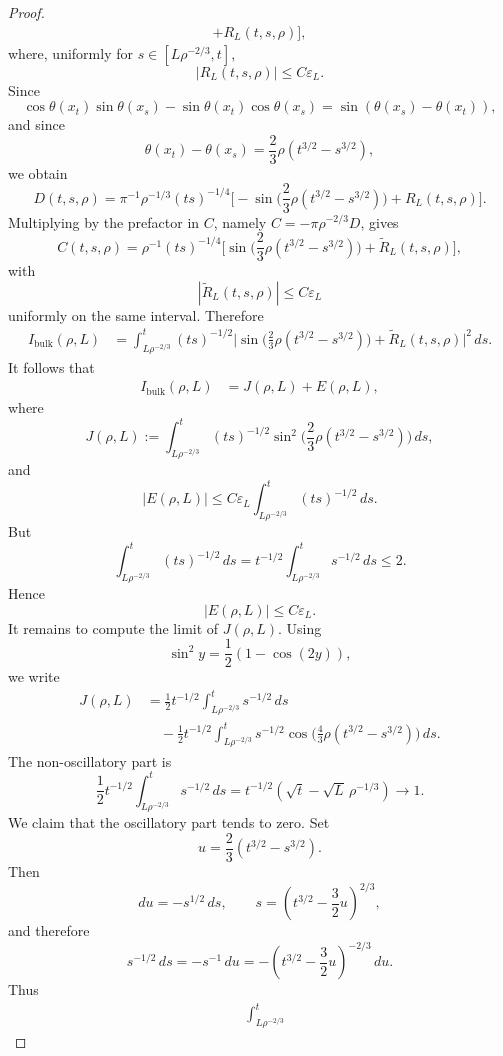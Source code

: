 \documentclass{article}
\begin{document}
\begin{proof}
\[\begin{aligned}
 +
 R_L(t,s,\rho)
\Big],
\end{aligned}
\]
where, uniformly for \(s\in[L\rho^{-2/3},t]\),
\[
  |R_L(t,s,\rho)|\le C\varepsilon_L .
\]
Since
\[
  \cos\theta(x_t)\sin\theta(x_s)
  -
  \sin\theta(x_t)\cos\theta(x_s)
  =
  \sin(\theta(x_s)-\theta(x_t)),
\]
and since
\[
  \theta(x_t)-\theta(x_s)
  =
  \frac23 \rho(t^{3/2}-s^{3/2}),
\]
we obtain
\[
D(t,s,\rho)
=
\pi^{-1}\rho^{-1/3}(ts)^{-1/4}
\Big[
 -\sin\Big(\frac23\rho(t^{3/2}-s^{3/2})\Big)
 +
 R_L(t,s,\rho)
\Big].
\]
Multiplying by the prefactor in \(C\), namely \(C=-\pi\rho^{-2/3}D\), gives
\[
C(t,s,\rho)
=
\rho^{-1}(ts)^{-1/4}
\Big[
 \sin\Big(\frac23\rho(t^{3/2}-s^{3/2})\Big)
 +
 \widetilde R_L(t,s,\rho)
\Big],
\]
with
\[
  |\widetilde R_L(t,s,\rho)|\le C\varepsilon_L
\]
uniformly on the same interval. Therefore
\[
\begin{aligned}
I_{\mathrm{bulk}}(\rho,L)
&=
\int_{L\rho^{-2/3}}^t
(ts)^{-1/2}
\Big|
 \sin\Big(\frac23\rho(t^{3/2}-s^{3/2})\Big)
 +
 \widetilde R_L(t,s,\rho)
\Big|^2\,ds .
\end{aligned}
\]
It follows that
\[
\begin{aligned}
I_{\mathrm{bulk}}(\rho,L)
&=
J(\rho,L)+E(\rho,L),
\end{aligned}
\]
where
\[
  J(\rho,L)
  :=
  \int_{L\rho^{-2/3}}^t
  (ts)^{-1/2}
  \sin^2\Big(\frac23\rho(t^{3/2}-s^{3/2})\Big)\,ds,
\]
and
\[
  |E(\rho,L)|
  \le
  C\varepsilon_L
  \int_{L\rho^{-2/3}}^t (ts)^{-1/2}\,ds .
\]
But
\[
  \int_{L\rho^{-2/3}}^t (ts)^{-1/2}\,ds
  =
  t^{-1/2}
  \int_{L\rho^{-2/3}}^t s^{-1/2}\,ds
  \le 2.
\]
Hence
\[
  |E(\rho,L)|\le C\varepsilon_L .
\]
It remains to compute the limit of \(J(\rho,L)\). Using
\[
  \sin^2 y=\frac12(1-\cos(2y)),
\]
we write
\[
\begin{aligned}
J(\rho,L)
&=
\frac12 t^{-1/2}
\int_{L\rho^{-2/3}}^t s^{-1/2}\,ds        \\
&\quad
-
\frac12 t^{-1/2}
\int_{L\rho^{-2/3}}^t
s^{-1/2}
\cos\Big(\frac43\rho(t^{3/2}-s^{3/2})\Big)\,ds .
\end{aligned}
\]
The non-oscillatory part is
\[
  \frac12 t^{-1/2}
  \int_{L\rho^{-2/3}}^t s^{-1/2}\,ds
  =
  t^{-1/2}
  \left(\sqrt t-\sqrt L\,\rho^{-1/3}\right)
  \longrightarrow 1 .
\]
We claim that the oscillatory part tends to zero. Set
\[
  u=\frac23(t^{3/2}-s^{3/2}).
\]
Then
\[
  du=-s^{1/2}\,ds,
  \qquad
  s=\left(t^{3/2}-\frac32u\right)^{2/3},
\]
and therefore
\[
  s^{-1/2}\,ds
  =
  -s^{-1}\,du
  =
  -\left(t^{3/2}-\frac32u\right)^{-2/3}\,du .
\]
Thus
\[
\begin{aligned}
&\int_{L\rho^{-2/3}}^t

\end{aligned}\]
\end{proof}
\end{document}
